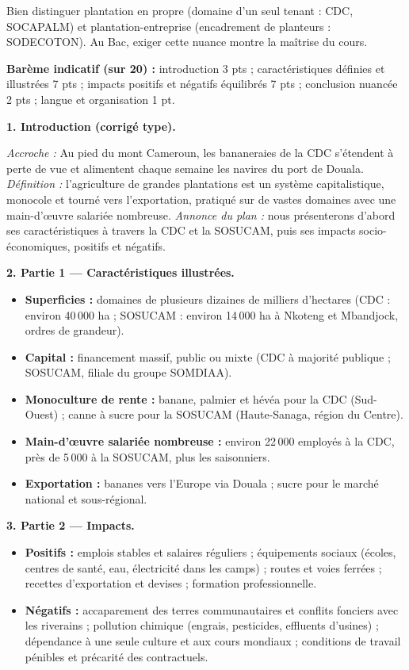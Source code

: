 \documentclass[11pt]{article}
\begin{document}
\begin{attention}
Bien distinguer \og plantation en propre \fg{} (domaine d'un seul tenant : CDC, SOCAPALM) et \og plantation-entreprise \fg{} (encadrement de planteurs : SODECOTON). Au Bac, exiger cette nuance montre la maîtrise du cours.
\end{attention}

\begin{corrige}
\textbf{Barème indicatif (sur 20) :} introduction 3 pts ; caractéristiques définies et illustrées 7 pts ; impacts positifs et négatifs équilibrés 7 pts ; conclusion nuancée 2 pts ; langue et organisation 1 pt.

\textbf{1. Introduction (corrigé type).}

\emph{Accroche :} Au pied du mont Cameroun, les bananeraies de la CDC s'étendent à perte de vue et alimentent chaque semaine les navires du port de Douala. \emph{Définition :} l'agriculture de grandes plantations est un système capitalistique, monocole et tourné vers l'exportation, pratiqué sur de vastes domaines avec une main-d'œuvre salariée nombreuse. \emph{Annonce du plan :} nous présenterons d'abord ses caractéristiques à travers la CDC et la SOSUCAM, puis ses impacts socio-économiques, positifs et négatifs.

\textbf{2. Partie 1 — Caractéristiques illustrées.}
\begin{itemize}
\item \textbf{Superficies :} domaines de plusieurs dizaines de milliers d'hectares (CDC : environ 40\,000 ha ; SOSUCAM : environ 14\,000 ha à Nkoteng et Mbandjock, ordres de grandeur).
\item \textbf{Capital :} financement massif, public ou mixte (CDC à majorité publique ; SOSUCAM, filiale du groupe SOMDIAA).
\item \textbf{Monoculture de rente :} banane, palmier et hévéa pour la CDC (Sud-Ouest) ; canne à sucre pour la SOSUCAM (Haute-Sanaga, région du Centre).
\item \textbf{Main-d'œuvre salariée nombreuse :} environ 22\,000 employés à la CDC, près de 5\,000 à la SOSUCAM, plus les saisonniers.
\item \textbf{Exportation :} bananes vers l'Europe via Douala ; sucre pour le marché national et sous-régional.
\end{itemize}

\textbf{3. Partie 2 — Impacts.}
\begin{itemize}
\item \textbf{Positifs :} emplois stables et salaires réguliers ; équipements sociaux (écoles, centres de santé, eau, électricité dans les camps) ; routes et voies ferrées ; recettes d'exportation et devises ; formation professionnelle.
\item \textbf{Négatifs :} accaparement des terres communautaires et conflits fonciers avec les riverains ; pollution chimique (engrais, pesticides, effluents d'usines) ; dépendance à une seule culture et aux cours mondiaux ; conditions de travail pénibles et précarité des contractuels.
\end{itemize}


\end{corrige}
\end{document}
